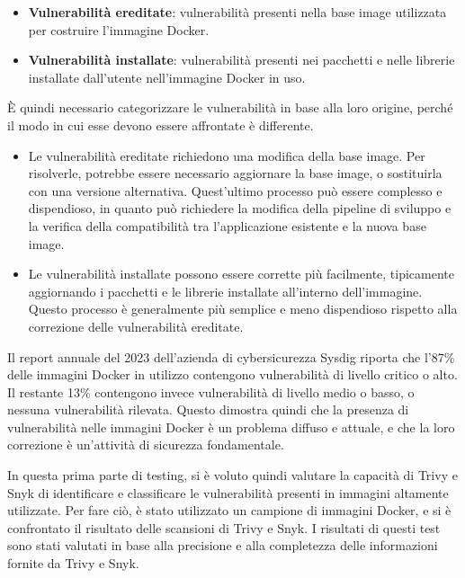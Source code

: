 \begin{itemize}
   \item \textbf{Vulnerabilità ereditate}: vulnerabilità presenti nella base image utilizzata per costruire l'immagine Docker.
   \item \textbf{Vulnerabilità installate}: vulnerabilità presenti nei pacchetti e nelle librerie installate dall'utente nell'immagine Docker in uso.
\end{itemize}
È quindi necessario categorizzare le vulnerabilità in base alla loro origine, perché il modo in cui esse devono essere affrontate è differente.
\begin{itemize}
   \item Le vulnerabilità ereditate richiedono una modifica della base image. Per risolverle, potrebbe essere necessario aggiornare la base image, o sostituirla con una versione alternativa. Quest'ultimo processo può essere complesso e dispendioso, in quanto può richiedere la modifica della pipeline di sviluppo e la verifica della compatibilità tra l'applicazione esistente e la nuova base image.
   \item Le vulnerabilità installate possono essere corrette più facilmente, tipicamente aggiornando i pacchetti e le librerie installate all'interno dell'immagine. Questo processo è generalmente più semplice e meno dispendioso rispetto alla correzione delle vulnerabilità ereditate.
\end{itemize}
Il report annuale del 2023 dell'azienda di cybersicurezza Sysdig\cite{sysdig_report} riporta che l'87\% delle immagini Docker in utilizzo contengono vulnerabilità di livello critico o alto. Il restante 13\% contengono invece vulnerabilità di livello medio o basso, o nessuna vulnerabilità rilevata. Questo dimostra quindi che la presenza di vulnerabilità nelle immagini Docker è un problema diffuso e attuale, e che la loro correzione è un'attività di sicurezza fondamentale.


In questa prima parte di testing, si è voluto quindi valutare la capacità di Trivy e Snyk di identificare e classificare le vulnerabilità presenti in immagini altamente utilizzate. Per fare ciò, è stato utilizzato un campione di immagini Docker, e si è confrontato il risultato delle scansioni di Trivy e Snyk. I risultati di questi test sono stati valutati in base alla precisione e alla completezza delle informazioni fornite da Trivy e Snyk.

